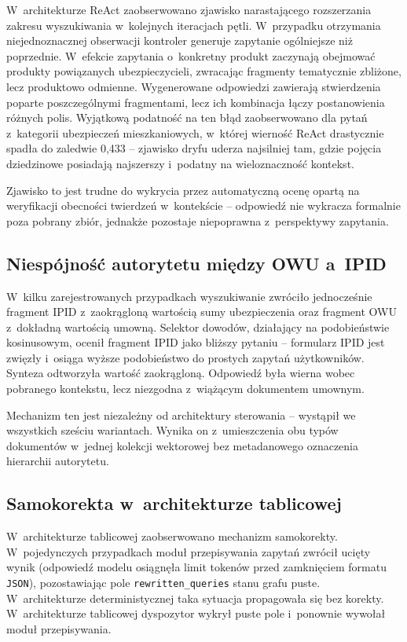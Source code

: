 W~architekturze ReAct zaobserwowano zjawisko narastającego rozszerzania zakresu
wyszukiwania w~kolejnych iteracjach pętli. W~przypadku otrzymania
niejednoznacznej obserwacji kontroler generuje zapytanie ogólniejsze niż
poprzednie. W~efekcie zapytania o~konkretny produkt zaczynają obejmować
produkty powiązanych ubezpieczycieli, zwracając fragmenty tematycznie zbliżone,
lecz produktowo odmienne. Wygenerowane odpowiedzi zawierają stwierdzenia
poparte poszczególnymi fragmentami, lecz ich kombinacja łączy postanowienia
różnych polis. Wyjątkową podatność na ten błąd zaobserwowano dla pytań z~kategorii
ubezpieczeń mieszkaniowych, w~której wierność ReAct drastycznie spadła do
zaledwie 0{,}433 -- zjawisko dryfu uderza najsilniej tam, gdzie pojęcia
dziedzinowe posiadają najszerszy i~podatny na wieloznaczność kontekst.

Zjawisko to jest trudne do wykrycia przez automatyczną ocenę opartą na
weryfikacji obecności twierdzeń w~kontekście -- odpowiedź nie wykracza
formalnie poza pobrany zbiór, jednakże pozostaje niepoprawna z~perspektywy
zapytania.

\subsection{Niespójność autorytetu między OWU a~IPID}\label{subsec:niespojnosc-autorytetu-miedzy-owu-a-ipid}

W~kilku zarejestrowanych przypadkach wyszukiwanie zwróciło jednocześnie
fragment IPID z~zaokrągloną wartością sumy ubezpieczenia oraz fragment OWU
z~dokładną wartością umowną. Selektor dowodów, działający na podobieństwie
kosinusowym, ocenił fragment IPID jako bliższy pytaniu -- formularz IPID jest
zwięzły i~osiąga wyższe podobieństwo do prostych zapytań użytkowników. Synteza
odtworzyła wartość zaokrągloną. Odpowiedź była wierna wobec pobranego
kontekstu, lecz niezgodna z~wiążącym dokumentem umownym.

Mechanizm ten jest niezależny od architektury sterowania -- wystąpił we
wszystkich sześciu wariantach. Wynika on z~umieszczenia obu typów dokumentów
w~jednej kolekcji wektorowej bez metadanowego oznaczenia hierarchii autorytetu.

\subsection{Samokorekta w~architekturze tablicowej}\label{subsec:samokorekta-w-architekturze-tablicowej}

W~architekturze tablicowej zaobserwowano mechanizm samokorekty. W~pojedynczych
przypadkach moduł przepisywania zapytań zwrócił ucięty wynik (odpowiedź modelu
osiągnęła limit tokenów przed zamknięciem formatu \texttt{JSON}), pozostawiając
pole \texttt{rewritten\_queries} stanu grafu puste. W~architekturze
deterministycznej taka sytuacja propagowała się bez korekty. W~architekturze
tablicowej dyspozytor wykrył puste pole i~ponownie wywołał moduł przepisywania.

